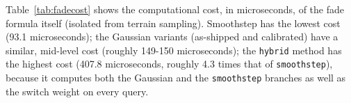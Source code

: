 Table~\ref{tab:fadecost} shows the computational cost, in microseconds, of the fade formula itself (isolated from terrain sampling). Smoothstep has the lowest cost (93.1 microseconds); the Gaussian variants (as-shipped and calibrated) have a similar, mid-level cost (roughly 149-150 microseconds); the \texttt{hybrid} method has the highest cost (407.8 microseconds, roughly 4.3 times that of \texttt{smoothstep}), because it computes both the Gaussian and the \texttt{smoothstep} branches as well as the switch weight on every query.
